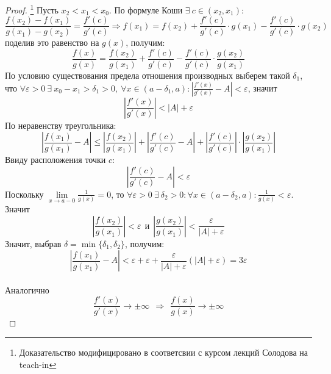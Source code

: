 \documentclass[a4paper, 12pt]{article}
\renewcommand{\epsilon}{\varepsilon}
\theoremstyle{definition}
\begin{document}
        \begin{proof}\footnote{Доказательство модифицировано в соответсвии с курсом лекций Солодова на teach-in}
            Пусть $x_2<x_1<x_0$. По формуле Коши $\exists\ c\in (x_2,x_1)$:
            \[\frac{f(x_2)-f(x_1)}{g(x_1)-g(x_2)}=\frac{f'(c)}{g'(c)} \Rightarrow f(x_1)=f(x_2)+\frac{f'(c)}{g'(c)}\cdot g(x_1)-\frac{f'(c)}{g'(c)}\cdot g(x_2)\]
            поделив это равенство на $g(x)$, получим:
            \[\frac{f(x)}{g(x)}=\frac{f(x_2)}{g(x_1)}+\frac{f'(c)}{g'(c)}-\frac{f'(c)}{g'(c)}\cdot \frac{g(x_2)}{g(x_1)}\]
            По условию существования предела отношения производных выберем такой $\delta_1$, что $\forall \epsilon>0\ \exists\ x_0-x_1>\delta_1>0,\ \forall x\in (a-\delta_1, a): |\frac{f'(x)}{g'(x)}-A|<\epsilon$, значит\\
            \[|\frac{f'(x)}{g'(x)}|<|A|+\epsilon\]
            По неравенству треугольника:
            \[|\frac{f(x_1)}{g(x_1)}-A|\leq |\frac{f(x_2)}{g(x_1)}|+|\frac{f'(c)}{g'(c)}-A|+|\frac{f'(c)}{g'(c)}|\cdot |\frac{g(x_2)}{g(x_1)}|\]
            Ввиду расположения точки $c$: \[|\frac{f'(c)}{g'(c)}-A|<\epsilon\]
            Поскольку $\lim\limits_{x\to a-0}\frac{1}{g(x)}=0$, то $\forall \epsilon>0\ \exists\ \delta_2>0: \forall x\in (a-\delta_2, a): \frac{1}{g(x)}<\epsilon$. Значит
            \[|\frac{f(x_2)}{g(x_1)}|<\epsilon\ \ \text{и}\ \ |\frac{g(x_2)}{g(x_1)}|<\frac{\epsilon}{|A|+\epsilon}\]
            Значит, выбрав $\delta = \min\{\delta_1,\delta_2\}$, получим:
            \[|\frac{f(x_1)}{g(x_1)}-A|<\epsilon+\epsilon+\frac{\epsilon}{|A|+\epsilon}(|A|+\epsilon)=3\epsilon\]
            \\
            Аналогично
            \[\frac{f'(x)}{g'(x)}\to \pm \infty\ \ \Rightarrow\ \ \frac{f(x)}{g(x)}\to \pm \infty\]
            
        \end{proof} 
\end{document}
